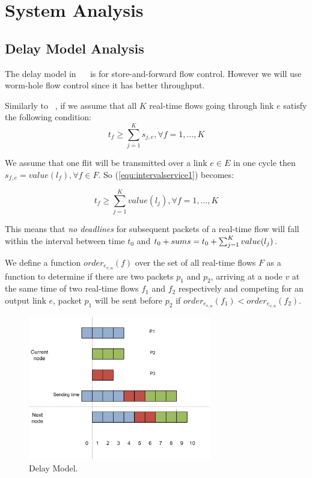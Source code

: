 \documentclass[conference, twocolumn]{IEEEtran}
\theoremstyle{definition}
\begin{document}
\section{System Analysis}
\subsection{Delay Model Analysis}

The delay model in ~\cite{Ferrari90ascheme}~\cite{VermaJitter91} is
for store-and-forward flow control. However we will use worm-hole flow
control since it has better throughput.


Similarly to ~\cite{Ferrari90ascheme}, if we assume that all $K$ 
real-time flows going through link $e$ satisfy the following condition:
\begin{equation}\label{equ:intervalservice1}
t_f \geq \sum_{j=1}^Ks_{j,e}, \forall f = 1,...,K
\end{equation}

We assume that one flit will be transmitted over a link $e \in E$ in one cycle
then $s_{f,e}=value(l_f), \forall f \in F$. So (\ref{equ:intervalservice1})
becomes:

\begin{equation}\label{equ:intervalservice2}
t_f \geq \sum_{j=1}^Kvalue(l_j), \forall f = 1,...,K
\end{equation}

This means that {\em no deadlines} for subsequent packets of a real-time flow
will fall within the interval between time $t_0$ and $t_0 + \\sum s = t_0 +
\sum_{j=1}^Kvalue(l_j)$.

We define a function $order_{e_{v,u}}(f)$ over the set of all real-time flows
$F$ as a function to determine if there are two packets $p_1$ and $p_2$, arriving at
a node $v$ at the same time of two real-time flows $f_1$ and $f_2$ respectively
and competing for an output link $e$, packet $p_1$ will be sent before $p_2$ if
$order_{e_{v,u}}(f_1) < order_{e_{v,u}}(f_2)$. 

\begin{figure}[htbp]
\centering
\includegraphics[width=8cm]{pics/DelayModel.png}
\caption[Delays for packets.]
{Delay Model.}\label{fig:DelayModel}
\end{figure}
\end{document}
